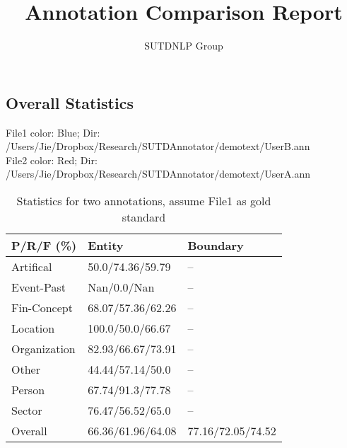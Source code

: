 \documentclass[runningheads,a4paper]{llncs}
\begin{document}
\begin{CJK*}{UTF8}{gbsn}
\mainmatter  %
\title{Annotation Comparison Report}
\author{SUTDNLP Group}
\maketitle

\section{Overall Statistics}
File1 color: \colorbox{blue!30}{Blue}; Dir: \colorbox{blue!30}{/Users/Jie/Dropbox/Research/SUTDAnnotator/demotext/UserB.ann}\\
File2 color: \colorbox{red!30}{Red}; Dir: \colorbox{red!30}{/Users/Jie/Dropbox/Research/SUTDAnnotator/demotext/UserA.ann}\\
\begin{table}[!htbp]
\centering
\caption{Statistics for two annotations, assume File1 as gold standard}
\begin{tabular}{l|l|l}
\hline
P/R/F (\%)& Entity &Boundary\\
\hline
Artifical& 50.0/74.36/59.79 &--\\
Event-Past& Nan/0.0/Nan &--\\
Fin-Concept& 68.07/57.36/62.26 &--\\
Location& 100.0/50.0/66.67 &--\\
Organization& 82.93/66.67/73.91 &--\\
Other& 44.44/57.14/50.0 &--\\
Person& 67.74/91.3/77.78 &--\\
Sector& 76.47/56.52/65.0 &--\\
\hline
Overall& 66.36/61.96/64.08 &77.16/72.05/74.52\\
\hline
\end{tabular}
\end{table}

\end{CJK*}
\end{document}
